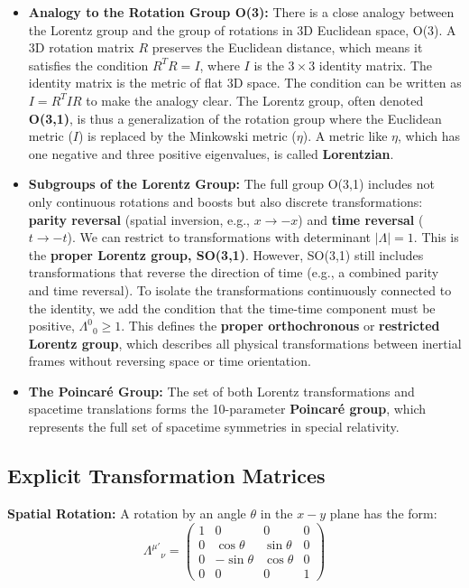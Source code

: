 \documentclass[11pt, a4paper]{report}
\begin{document}
\begin{itemize}
    \item \textbf{Analogy to the Rotation Group O(3):}
    There is a close analogy between the Lorentz group and the group of rotations in 3D Euclidean space, O(3). A 3D rotation matrix $R$ preserves the Euclidean distance, which means it satisfies the condition $R^T R = I$, where $I$ is the $3 \times 3$ identity matrix. The identity matrix is the metric of flat 3D space. The condition can be written as $I = R^T I R$ to make the analogy clear. The Lorentz group, often denoted \textbf{O(3,1)}, is thus a generalization of the rotation group where the Euclidean metric ($I$) is replaced by the Minkowski metric ($\eta$). A metric like $\eta$, which has one negative and three positive eigenvalues, is called \textbf{Lorentzian}.

    \item \textbf{Subgroups of the Lorentz Group:}
    The full group O(3,1) includes not only continuous rotations and boosts but also discrete transformations: \textbf{parity reversal} (spatial inversion, e.g., $x \rightarrow -x$) and \textbf{time reversal} ($t \rightarrow -t$). We can restrict to transformations with determinant $|\Lambda|=1$. This is the \textbf{proper Lorentz group, SO(3,1)}. However, SO(3,1) still includes transformations that reverse the direction of time (e.g., a combined parity and time reversal). To isolate the transformations continuously connected to the identity, we add the condition that the time-time component must be positive, ${\Lambda^0}_0 \ge 1$. This defines the \textbf{proper orthochronous} or \textbf{restricted Lorentz group}, which describes all physical transformations between inertial frames without reversing space or time orientation.

    \item \textbf{The Poincaré Group:} The set of both Lorentz transformations and spacetime translations forms the 10-parameter \textbf{Poincaré group}, which represents the full set of spacetime symmetries in special relativity.
\end{itemize}

\subsection*{Explicit Transformation Matrices}

\textbf{Spatial Rotation:} A rotation by an angle $\theta$ in the $x-y$ plane has the form:
\begin{equation}\label{eq:rotation-matrix}
    {\Lambda^{\mu'}}_{\nu} =
    \begin{pmatrix}
        1 & 0 & 0 & 0 \\
        0 & \cos\theta & \sin\theta & 0 \\
        0 & -\sin\theta & \cos\theta & 0 \\
        0 & 0 & 0 & 1
    \end{pmatrix}
\end{equation}
\end{document}
